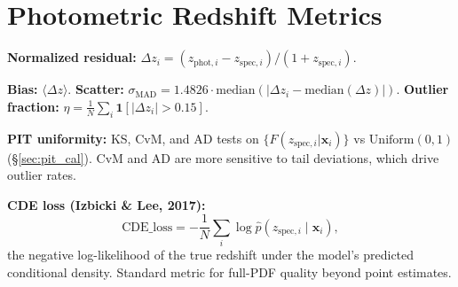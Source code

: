 \documentclass[11pt,a4paper]{article}
\theoremstyle{definition}
\newcommand{\bx}{\mathbf{x}}
\begin{document}
\section{Photometric Redshift Metrics}
\label{sec:pz_metrics}

\textbf{Normalized residual:}
$\Delta z_i = (z_{\mathrm{phot},i} - z_{\mathrm{spec},i}) / (1 + z_{\mathrm{spec},i})$.

\textbf{Bias:} $\langle \Delta z \rangle$.
\textbf{Scatter:} $\sigma_{\mathrm{MAD}} = 1.4826 \cdot \mathrm{median}(|\Delta z_i - \mathrm{median}(\Delta z)|)$.
\textbf{Outlier fraction:} $\eta = \frac{1}{N}\sum_i \mathbf{1}[|\Delta z_i| > 0.15]$.

\textbf{PIT uniformity:} KS, CvM, and AD tests on
$\{F(z_{\mathrm{spec},i}|\bx_i)\}$ vs $\mathrm{Uniform}(0,1)$
(§\ref{sec:pit_cal}). CvM and AD are more sensitive to tail deviations,
which drive outlier rates.

\textbf{CDE loss (Izbicki \& Lee, 2017):}
\begin{equation}
  \mathrm{CDE\_loss} = -\frac{1}{N}\sum_i \log \hat{p}(z_{\mathrm{spec},i} \mid \bx_i),
  \label{eq:cde}
\end{equation}
the negative log-likelihood of the true redshift under the model's
predicted conditional density. Standard metric for full-PDF quality
beyond point estimates.
\end{document}
